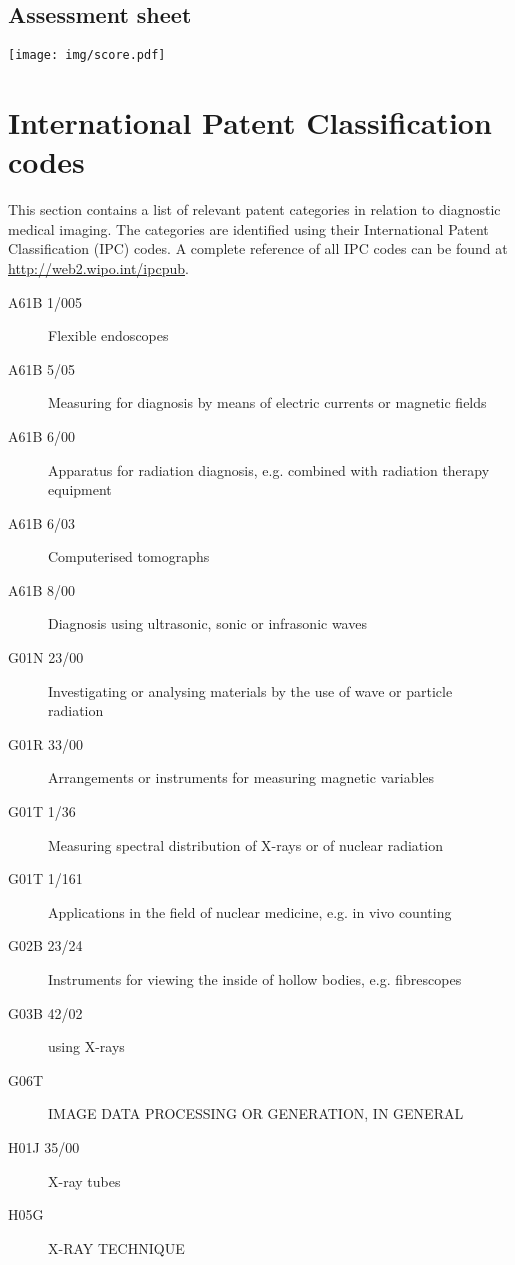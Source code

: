 \appendix
\begin{landscape}
	\chapter{Assessment sheet}\label{app:score}
	\texttt{[image: img/score.pdf]}
\end{landscape}

\chapter{International Patent Classification codes}
This section contains a list of relevant patent categories in relation to
diagnostic medical imaging. The categories are identified using their
International Patent Classification (IPC) codes. A complete reference of all IPC
codes can be found at \url{http://web2.wipo.int/ipcpub}.

\begin{description}
  \item[A61B 1/005] Flexible endoscopes
  \item[A61B 5/05] Measuring for diagnosis by means of electric currents or magnetic fields
  \item[A61B 6/00] Apparatus for radiation diagnosis, e.g. combined with radiation therapy equipment
  \item[A61B 6/03] Computerised tomographs
  \item[A61B 8/00] Diagnosis using ultrasonic, sonic or infrasonic waves
  \item[G01N 23/00] Investigating or analysing materials by the use of wave or particle radiation
  \item[G01R 33/00] Arrangements or instruments for measuring magnetic variables
  \item[G01T 1/36] Measuring spectral distribution of X-rays or of nuclear radiation
  \item[G01T 1/161] Applications in the field of nuclear medicine, e.g. in vivo counting
  \item[G02B 23/24] Instruments for viewing the inside of hollow bodies, e.g. fibrescopes
  \item[G03B 42/02] using X-rays
  \item[G06T] IMAGE DATA PROCESSING OR GENERATION, IN GENERAL 
  \item[H01J 35/00] X-ray tubes
  \item[H05G] X-RAY TECHNIQUE
\end{description}